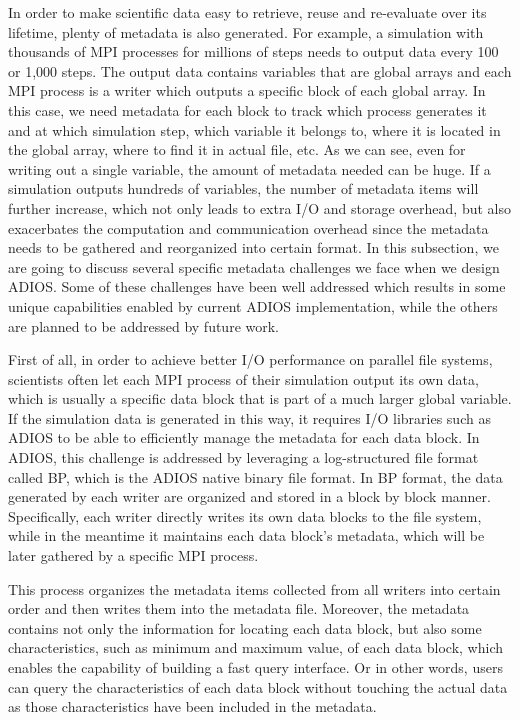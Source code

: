In order to make scientific data
easy to retrieve, reuse and re-evaluate over its lifetime, plenty  of  metadata  
is also generated. For example, a simulation 
with thousands of MPI processes for millions of steps needs to output data every 100 or 1,000 steps. The output data contains variables that are global arrays and each MPI process is a writer which outputs a specific block of each global array. In this case, we need metadata for each block to track which process generates it and at which simulation step, which variable it belongs to, where it is located in the global array, where to find it in actual file, etc.  As we can see, even for writing out a single variable, the amount of metadata needed can be huge. If a simulation outputs hundreds of variables, the  number of metadata items will further increase, which not only leads to extra I/O and storage overhead, but also exacerbates the computation and communication overhead since the metadata needs to be gathered and reorganized into certain format. In this subsection, we are going to discuss several specific metadata challenges we face when we design ADIOS. Some of these challenges have been well addressed which results in some unique capabilities enabled by current ADIOS implementation, while the others are planned to be addressed by future work.

First of all, in order to achieve better I/O performance on parallel file systems, scientists often let each MPI process of their simulation output its own data, which is usually a specific data block that is part of a much larger global variable. If the simulation data is generated in this way, it requires I/O libraries such as ADIOS to be able to efficiently manage the metadata for each data block. In ADIOS, this challenge is addressed by leveraging a log-structured file format called BP, which is the ADIOS native binary file format. In BP format, the data generated by each writer are organized and stored in a block by block manner. Specifically, each writer directly writes its own data blocks to the file system, while in the meantime it maintains each data block's metadata, which will be later gathered by a specific MPI process.
 
This process organizes the metadata items collected from all writers into certain order and then writes them into the metadata file. Moreover, the metadata contains not only the information for locating each data block, but also some characteristics, such as minimum and maximum value,  of each data block, which enables the capability of building a fast query interface. Or in other words, users can query the characteristics of each data block without touching the actual data as those characteristics have been included in the metadata.


